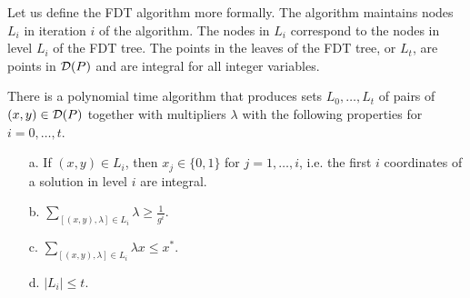 Let us define the FDT algorithm more formally. The algorithm maintains nodes $L_i$ in iteration $i$ of the algorithm. The nodes in $L_i$ correspond to the nodes in level $L_i$ of the FDT tree. The points in the leaves of the FDT tree, or $L_t$, are points in $\operatorname{\mathcal{D}}(P)$ and are integral for all integer variables.



\begin{lemma}\label{prune}
	There is a polynomial time algorithm that produces sets $L_0,\ldots,L_t$ of pairs of $(x,y)\in \operatorname{\mathcal{D}}(P)$ together with multipliers $\lambda$ with the following properties for $i=0,\ldots,t$. 
	\begin{enumerate}
			\item[a.] If $(x,y)\in L_i$, then $x_j \in \{0,1\}$ for $j=1,\ldots,i$, i.e. the first $i$ coordinates of a solution in level $i$ are integral. 
		\item[b.] $\sum_{[(x,y),\lambda]\in L_i} \lambda\geq\frac{1}{g^i}$.
		\item[c.] $\sum_{[(x,y),\lambda]\in L_i}\lambda x \leq x^*$.
		\item[d.] $|L_i|\leq t$.
	\end{enumerate}
\end{lemma}
